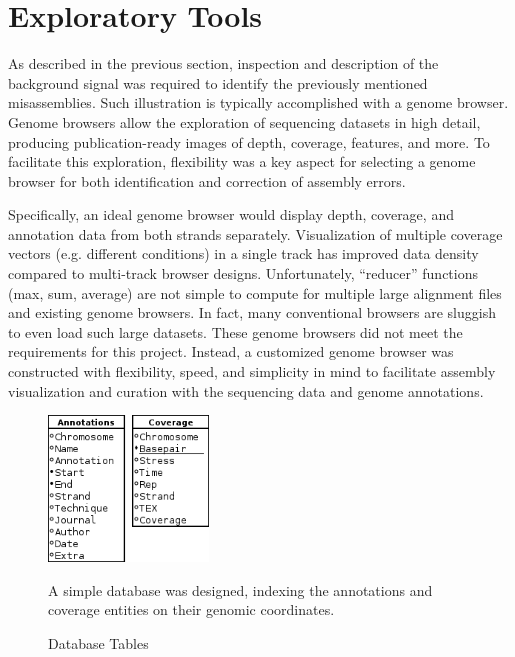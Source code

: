 
\section{Exploratory Tools}

As described in the previous section, inspection and description of the background signal was required to identify the previously mentioned misassemblies. Such illustration is typically accomplished with a genome browser. Genome browsers allow the exploration of sequencing datasets in high detail, producing publication-ready images of depth, coverage, features, and more. To facilitate this exploration, flexibility was a key aspect for selecting a genome browser for both identification and correction of assembly errors.

Specifically, an ideal genome browser would display depth, coverage, and annotation data from both strands separately. Visualization of multiple coverage vectors (e.g. different conditions) in a single track has improved data density compared to multi-track browser designs. Unfortunately, ``reducer'' functions (max, sum, average) are not simple to compute for multiple large alignment files and existing genome browsers. In fact, many conventional browsers are sluggish to even load such large datasets.\cite{191,192} These genome browsers did not meet the requirements for this project. Instead, a customized genome browser was constructed with flexibility, speed, and simplicity in mind to facilitate assembly visualization and curation with the sequencing data and genome annotations.

\begin{figure}
\small
\vspace{-20pt}
\begin{center}
\includegraphics[width=0.38\textwidth]{images/Assembly/Browser/Genome_browser_schema.png}
\end{center}
\vspace{-20pt}
\caption{Database Tables}\label{fig:5.5}
A simple database was designed, indexing the annotations and coverage entities on their genomic coordinates.
\end{figure}

